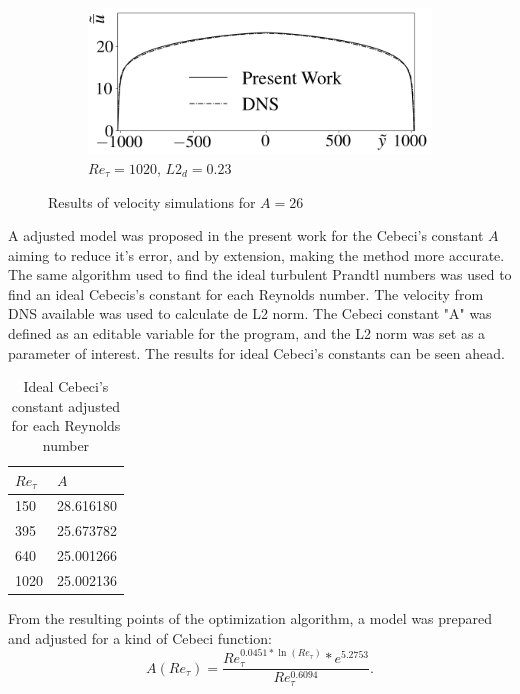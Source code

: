 \documentclass[10pt]{article} %
\begin{document}
\begin{figure}[!h]
	\begin{subfigure}[t]{0.45\textwidth}
		\centering
		\includegraphics[angle=0, scale=0.24]{fotos_formatacao_final/Temperature_1000_Avelocity}
		\caption{$Re_\tau = 1020$, $L2_d = 0.23$}
	\end{subfigure}	
	\caption{Results of velocity simulations for $A = 26$}
	\label{figura_10}
\end{figure}


A adjusted model was proposed in the present work for the Cebeci's constant $A$ aiming to reduce it's error, and by extension, making the method more accurate. The same algorithm used to find the ideal turbulent Prandtl numbers was used to find an ideal Cebecis's constant for each Reynolds number. The velocity from DNS available was used to calculate de L2 norm. The Cebeci constant "A" was defined as an editable variable for the program, and the L2 norm was set as a parameter of interest. The results for ideal Cebeci's constants can be seen ahead.

\newpage

\begin{table}[!h]
	\centering
	\caption{Ideal Cebeci's constant adjusted for each Reynolds number}
	\begin{tabular}{ll}
		\hline
		$Re_\tau$ & $A$\\
		\hline
		150  &   28.616180\\
		395  &   25.673782\\
		640  &   25.001266\\
		1020 &   25.002136\\ 
		\hline
	\end{tabular}
	\label{tablea}
\end{table}

 From the resulting points of the optimization algorithm, a model was prepared and adjusted for a kind of Cebeci function:
\begin{equation}
A \left( Re_\tau\right)= \frac{Re_\tau ^{0.0451 * \ln(Re_\tau)} *e ^ {5.2753} }{Re_\tau ^{0.6094}}.
\end{equation}
\end{document}
